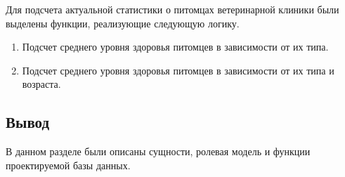 Для подсчета актуальной статистики о питомцах ветеринарной клиники были выделены функции, реализующие следующую логику.
\begin{enumerate}[label=\arabic*)]
	\item Подсчет среднего уровня здоровья питомцев в зависимости от их типа.
	\item Подсчет среднего уровня здоровья питомцев в зависимости от их типа и возраста.
\end{enumerate}

\subsection*{Вывод}
В данном разделе были описаны сущности, ролевая модель и функции проектируемой базы данных. 